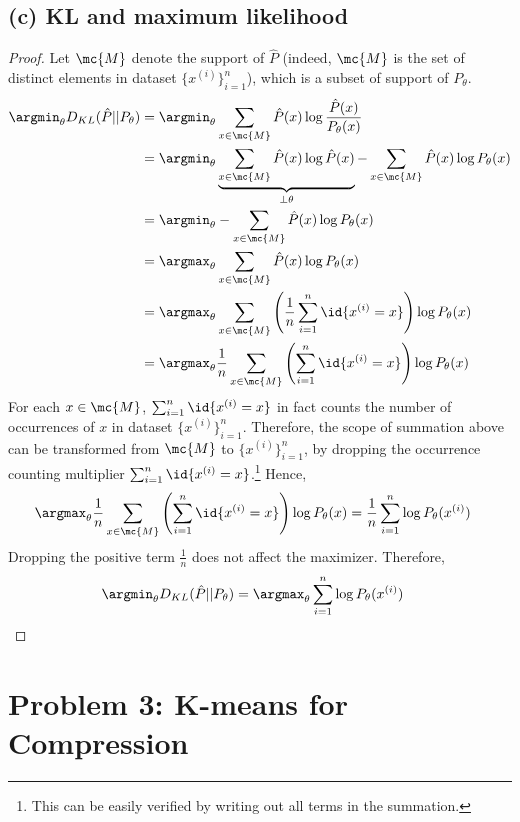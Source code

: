 \documentclass[11pt]{article}
\newcommand{\upi}[0]{^{(i)}}
\begin{document}
	\subsection{(c) KL and maximum likelihood}
	\begin{proof}
		Let $\mc{M}$ denote the support of $\hat{P}$ (indeed, $\mc{M}$ is the set of distinct elements in dataset $\{x\upi\}_{i=1}^n$), which is a subset of support of $P_\theta$.
		\begin{align}
			\argmin_\theta D_{KL}(\hat{P}||P_\theta) &= \argmin_\theta \sum_{x \in \mc{M}} \hat{P}(x) \log \frac{\hat{P}(x)}{P_\theta(x)} \\
			&= \argmin_\theta \underbrace{\sum_{x \in \mc{M}} \hat{P}(x) \log \hat{P}(x)}_{\perp \theta} - \sum_{x \in \mc{M}} \hat{P}(x) \log P_\theta(x) \\
			&= \argmin_\theta - \sum_{x \in \mc{M}} \hat{P}(x) \log P_\theta(x) \\
			&= \argmax_\theta  \sum_{x \in \mc{M}} \hat{P}(x) \log P_\theta(x) \\
			&= \argmax_\theta \sum_{x \in \mc{M}}\left( \frac{1}{n} \sum_{i=1}^n \id{x\upi = x} \right ) \log P_\theta(x) \\
			&= \argmax_\theta \frac{1}{n} \sum_{x \in \mc{M}}\left( \sum_{i=1}^n \id{x\upi = x} \right ) \log P_\theta(x) 
		\end{align}
		For each $x \in \mc{M}$, $\sum_{i=1}^n \id{x\upi = x}$ in fact counts the number of occurrences of $x$ in dataset $\{x\upi\}_{i=1}^n$. Therefore, the scope of summation above can be transformed from $\mc{M}$ to $\{x\upi\}_{i=1}^n$, by dropping the occurrence counting multiplier $\sum_{i=1}^n \id{x\upi = x}$.\footnote{This can be easily verified by writing out all terms in the summation.} Hence,
		\begin{align}
			\argmax_\theta \frac{1}{n} \sum_{x \in \mc{M}}\left( \sum_{i=1}^n \id{x\upi = x} \right ) \log P_\theta(x) &= \frac{1}{n} \sum_{i=1}^n \log P_\theta (x\upi)
		\end{align}
		Dropping the positive term $\frac{1}{n}$ does not affect the maximizer. Therefore,
		\begin{align}
			\argmin_\theta D_{KL}(\hat{P}||P_\theta) &= \argmax_\theta \sum_{i=1}^n \log P_\theta (x\upi)
		\end{align}
	\end{proof}
	
	\newpage
	\section{Problem 3: K-means for Compression}
\end{document}

